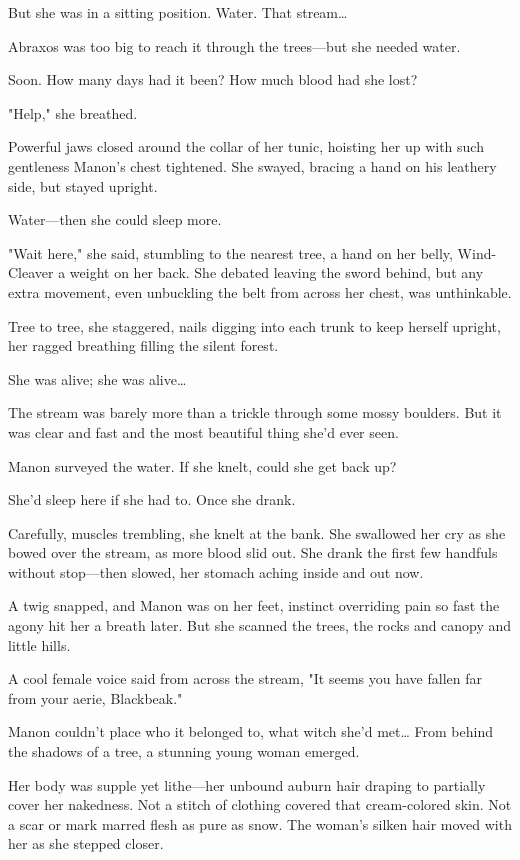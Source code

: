 But she was in a sitting position.
Water.
That stream\ldots{}

Abraxos was too big to reach it through the trees---but she needed water.

Soon.
How many days had it been?
How much blood had she lost?

"Help," she breathed.

Powerful jaws closed around the collar of her tunic, hoisting her up with such gentleness Manon's chest tightened.
She swayed, bracing a hand on his leathery side, but stayed upright.

Water---then she could sleep more.

"Wait here," she said, stumbling to the nearest tree, a hand on her belly, Wind-Cleaver a weight on her back.
She debated leaving the sword behind, but any extra movement, even unbuckling the belt from across her chest, was unthinkable.

Tree to tree, she staggered, nails digging into each trunk to keep herself upright, her ragged breathing filling the silent forest.

She was alive; she was alive\ldots{}

The stream was barely more than a trickle through some mossy boulders.
But it was clear and fast and the most beautiful thing she'd ever seen.

Manon surveyed the water.
If she knelt, could she get back up?

She'd sleep here if she had to.
Once she drank.

Carefully, muscles trembling, she knelt at the bank.
She swallowed her cry as she bowed over the stream, as more blood slid out.
She drank the first few handfuls without stop---then slowed, her stomach aching inside and out now.

A twig snapped, and Manon was on her feet, instinct overriding pain so fast the agony hit her a breath later.
But she scanned the trees, the rocks and canopy and little hills.

A cool female voice said from across the stream, "It seems you have fallen far from your aerie, Blackbeak."

Manon couldn't place who it belonged to, what witch she'd met\ldots{}
From behind the shadows of a tree, a stunning young woman emerged.

Her body was supple yet lithe---her unbound auburn hair draping to partially cover her nakedness.
Not a stitch of clothing covered that cream-colored skin.
Not a scar or mark marred flesh as pure as snow.
The woman's silken hair moved with her as she stepped closer.

